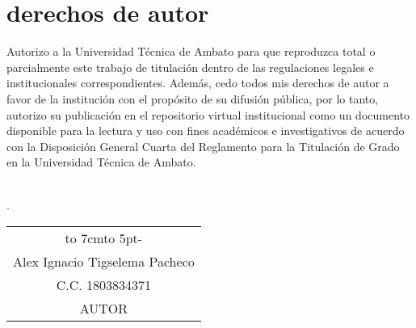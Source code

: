 \chapter*{derechos de autor}
Autorizo a la Universidad Técnica de Ambato para que reproduzca total o parcialmente
este trabajo de titulación dentro de las regulaciones legales e institucionales
correspondientes. Además, cedo todos mis derechos de autor a favor de la institución
con el propósito de su difusión pública, por lo tanto, autorizo su publicación en el
repositorio virtual institucional como un documento disponible para la lectura y uso
con fines académicos e investigativos de acuerdo con la Disposición General Cuarta
del Reglamento para la Titulación de Grado en la Universidad Técnica de Ambato.
\\
\\
\begin{flushright}
	\lugarFechaPrelims.
\end{flushright}

\vspace*{5cm}
\begin{center}
	\begin{tabular}{c}
		\hbox to 7cm{\leaders\hbox to 5pt{\hss - \hss}\hfil} \\
		Alex Ignacio Tigselema Pacheco                      \\
		C.C. 1803834371                                      \\
		AUTOR
	\end{tabular}
\end{center}
